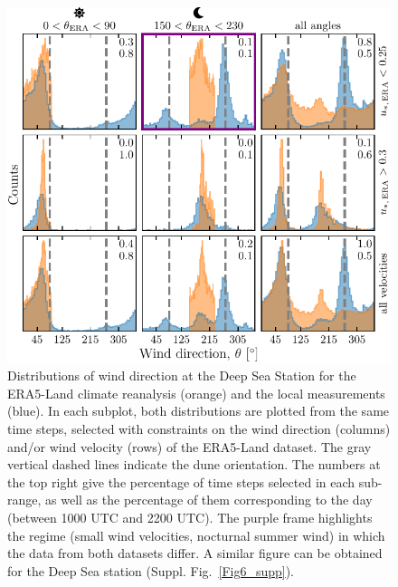 \begin{figure}
\centering
\includegraphics[scale=1]{Figures/Figure3.pdf}
\caption{Distributions of wind direction at the Deep Sea Station for the ERA5-Land climate reanalysis (orange) and the local measurements (blue). In each subplot, both distributions are plotted from the same time steps, selected with constraints on the wind direction (columns) and/or wind velocity (rows) of the ERA5-Land dataset. The gray vertical dashed lines indicate the dune orientation. The numbers at the top right give the percentage of time steps selected in each sub-range, as well as the percentage of them corresponding to the day (between 1000 UTC and 2200 UTC). The purple frame highlights the regime (small wind velocities, nocturnal summer wind) in which the data from both datasets differ. A similar figure can be obtained for the Deep Sea station (Suppl. Fig.~\ref{Fig6_supp}).}
\label{Fig3}
\end{figure}


